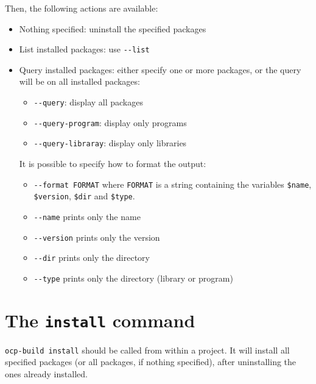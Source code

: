 Then, the following actions are available:
\begin{itemize}
\item Nothing specified: uninstall the specified packages
\item List installed packages: use \verb|--list|
\item Query installed packages: either specify one or more packages,
  or the query will be on all installed packages:
\begin{itemize}
\item \verb|--query|: display all packages
\item \verb|--query-program|: display only programs
\item \verb|--query-libraray|: display only libraries
\end{itemize}
It is possible to specify how to format the output:
\begin{itemize}
\item \verb|--format FORMAT| where \verb|FORMAT| is a string
  containing the variables \verb|$name|, \verb|$version|,
  \verb|$dir| and \verb|$type|.
  \item \verb|--name| prints only the name
  \item \verb|--version| prints only the version
  \item \verb|--dir| prints only the directory
  \item \verb|--type| prints only the directory (library or program)
\end{itemize}
\end{itemize}


\section{The {\tt install} command}

\verb|ocp-build install| should be called from within a project. It
will install all specified packages (or all packages, if nothing
specified), after uninstalling the ones already installed.


